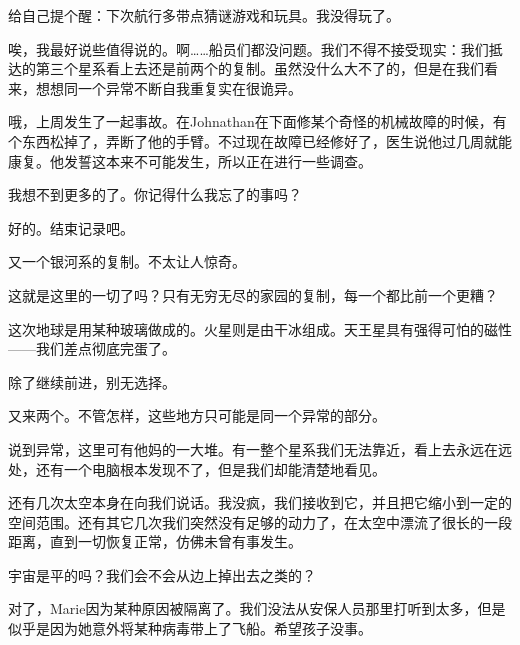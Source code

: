 \hr

\begin{scpbox}


给自己提个醒：下次航行多带点猜谜游戏和玩具。我没得玩了。


唉，我最好说些值得说的。啊……船员们都没问题。我们不得不接受现实：我们抵达的第三个星系看上去还是前两个的复制。虽然没什么大不了的，但是在我们看来，想想同一个异常不断自我重复实在很诡异。

哦，上周发生了一起事故。在Johnathan在下面修某个奇怪的机械故障的时候，有个东西松掉了，弄断了他的手臂。不过现在故障已经修好了，医生说他过几周就能康复。他发誓这本来不可能发生，所以正在进行一些调查。

我想不到更多的了。你记得什么我忘了的事吗？


好的。结束记录吧。


\end{scpbox}

\hr

\begin{scpbox}


又一个银河系的复制。不太让人惊奇。

这就是这里的一切了吗？只有无穷无尽的家园的复制，每一个都比前一个更糟？


这次地球是用某种玻璃做成的。火星则是由干冰组成。天王星具有强得可怕的磁性——我们差点彻底完蛋了。

除了继续前进，别无选择。


\end{scpbox}

\hr

\begin{scpbox}


又来两个。不管怎样，这些地方只可能是同一个异常的部分。

说到异常，这里可有他妈的一大堆。有一整个星系我们无法靠近，看上去永远在远处，还有一个电脑根本发现不了，但是我们却能清楚地看见。

还有几次太空本身在向我们说话。我没疯，我们接收到它，并且把它缩小到一定的空间范围。还有其它几次我们突然没有足够的动力了，在太空中漂流了很长的一段距离，直到一切恢复正常，仿佛未曾有事发生。

宇宙是平的吗？我们会不会从边上掉出去之类的？


对了，Marie因为某种原因被隔离了。我们没法从安保人员那里打听到太多，但是似乎是因为她意外将某种病毒带上了飞船。希望孩子没事。


\end{scpbox}

